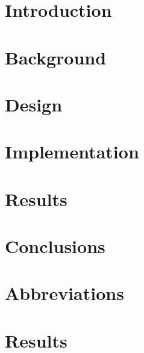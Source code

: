\documentclass[12pt,twoside]{kau_report}
\begin{document}
\section{Introduction}
\label{sec:introduction}

\cleardoublepage

\section{Background}
\label{sec:background}

\cleardoublepage

\section{Design}
\label{sec:design}

\cleardoublepage

\section{Implementation}
\label{sec:implementation}

\cleardoublepage

\section{Results} %
\label{sec:resultevaluation}

\cleardoublepage

\section{Conclusions}
\label{sec:conclusion}

\cleardoublepage


\begin{singlespace}


\end{singlespace}
\cleardoublepage

\appendix
\section{Abbreviations}
\label{sec:abbreviations}

\cleardoublepage

\section{Results}
\label{app:results}



\cleardoublepage
\end{document}
